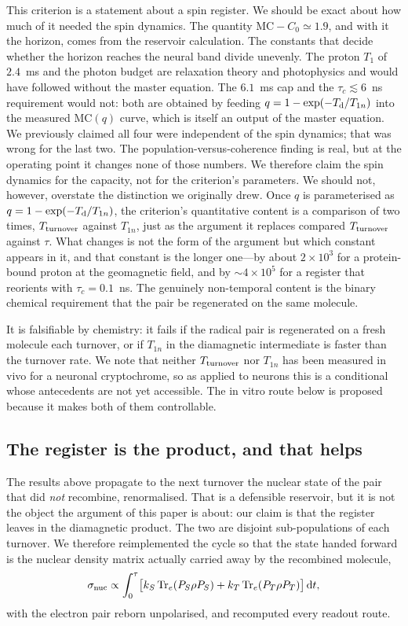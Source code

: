 \documentclass[aps,prx,reprint,superscriptaddress,nofootinbib,floatfix]{revtex4-2}
\begin{document}
This criterion is a statement about a spin register. We should be exact about how
much of it needed the spin dynamics. The quantity $\mathrm{MC}-C_0\simeq1.9$, and
with it the horizon, comes from the reservoir calculation. The constants that
decide whether the horizon reaches the neural band divide unevenly. The proton
$T_1$ of $2.4$~ms and the photon budget are relaxation theory and photophysics
and would have followed without the master equation. The $6.1$~ms cap and the
$\tau_c\lesssim6$~ns requirement would not: both are obtained by feeding
$q=1-\exp(-T_{\rm d}/T_{1n})$ into the measured $\mathrm{MC}(q)$ curve, which is
itself an output of the master equation. We previously claimed all four were
independent of the spin dynamics; that was wrong for the last two. The population-versus-coherence finding is real, but at the
operating point it changes none of those numbers. We therefore claim the spin
dynamics for the capacity, not for the criterion's parameters. We
should not, however, overstate the distinction we originally drew. Once $q$ is
parameterised as $q=1-\exp(-T_{\rm d}/T_{1n})$, the criterion's quantitative
content is a comparison of two times, $T_{\rm turnover}$ against $T_{1n}$, just as
the argument it replaces compared $T_{\rm turnover}$ against $\tau$. What changes
is not the form of the argument but which constant appears in it, and that
constant is the longer one---by about $2\times10^{3}$ for a protein-bound proton
at the geomagnetic field, and by $\sim4\times10^{5}$ for a register that reorients
with $\tau_c=0.1$~ns. The genuinely non-temporal content is the
binary chemical requirement that the pair be regenerated on the same molecule.

It is falsifiable by chemistry: it fails if the radical pair is regenerated on a
fresh molecule each turnover, or if $T_{1n}$ in the diamagnetic intermediate is
faster than the turnover rate. We note that neither $T_{\rm turnover}$ nor
$T_{1n}$ has been measured in vivo for a neuronal cryptochrome, so as applied to
neurons this is a conditional whose antecedents are not yet accessible. The in
vitro route below is proposed because it makes both of them controllable.

\subsection{The register is the product, and that helps}

The results above propagate to the next turnover the nuclear state of the pair
that did \emph{not} recombine, renormalised. That is a defensible reservoir, but
it is not the object the argument of this paper is about: our claim is that the
register leaves in the diamagnetic product. The two are disjoint sub-populations
of each turnover. We therefore reimplemented the cycle so that the state handed
forward is the nuclear density matrix actually carried away by the recombined
molecule,
\begin{equation}
\sigma_{\rm nuc}\propto\int_0^\tau\!\big[k_S\,\mathrm{Tr}_e(P_S\rho P_S)
 + k_T\,\mathrm{Tr}_e(P_T\rho P_T)\big]\,\mathrm{d}t ,
\label{eq:prodreg}
\end{equation}
with the electron pair reborn unpolarised, and recomputed every readout route.
\end{document}

